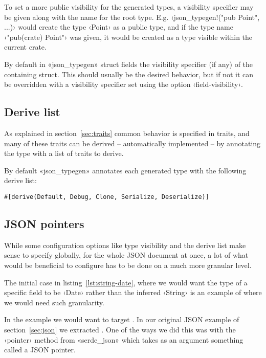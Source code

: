 To set a more public visibility for the generated types, a visibility specifier may be given along with the name for the root type. E.g. ‹json_typegen!("pub Point", ...)› would create the type ‹Point› as a public type, and if the type name ‹"pub(crate) Point"› was given, it would be created as a type visible within the current crate.

By default in «json_typegen» struct fields  the visibility specifier (if any) of the containing struct. This should usually be the desired behavior, but if not it can be overridden with a visibility specifier set using the option ‹field-visibility›.

\subsection{Derive list}

As explained in section~\ref{sec:traits} common behavior is specified in traits, and many of these traits can be derived -- automatically implemented -- by annotating the type with a list of traits to derive.

By default «json_typegen» annotates each generated type with the following derive list:

\begin{verbatim}
#[derive(Default, Debug, Clone, Serialize, Deserialize)]
\end{verbatim}

\morestuff

\subsection{JSON pointers}

While some configuration options like type visibility and the derive list make sense to specify globally, for the whole JSON document at once, a lot of what would be beneficial to configure has to be done on a much more granular level.

The initial case in listing~\ref{lst:string-date}, where we would want the type of a specific field to be ‹Date› rather than the inferred ‹String› is an example of where we would need such granularity.

In the example we would want to target . In our original JSON example of section~\ref{sec:json} we extracted . One of the ways we did this was with the ‹pointer› method from «serde_json» which takes as an argument something called a JSON pointer.


